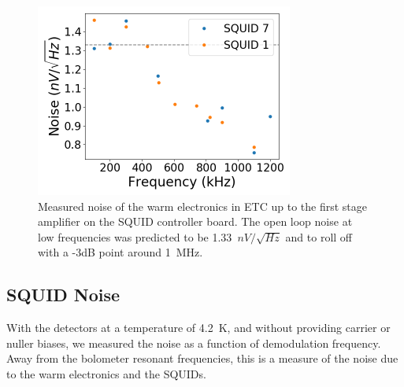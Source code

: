 \begin{figure}[ht!]
\begin{center}
\includegraphics[height=2.5in]{figures/warm_electronic_noise.png}
\caption{Measured noise of the warm electronics in \ac{ETC} up to the first stage amplifier on the \ac{SQUID} controller board. The open loop noise at low frequencies was predicted to be 1.33~$nV/\sqrt{Hz}$ and to roll off with a -3dB point around 1~MHz. 
\label{fig:dark_electronic_noise} }
\end{center}
\end{figure}




\subsection{SQUID Noise}
\label{sec:squid_noise}

With the detectors at a temperature of 4.2~K, and without providing carrier or nuller biases, we measured the noise as a function of demodulation frequency. 
Away from the bolometer resonant frequencies, this is a measure of the noise due to the warm electronics and the \ac{SQUID}s. 

